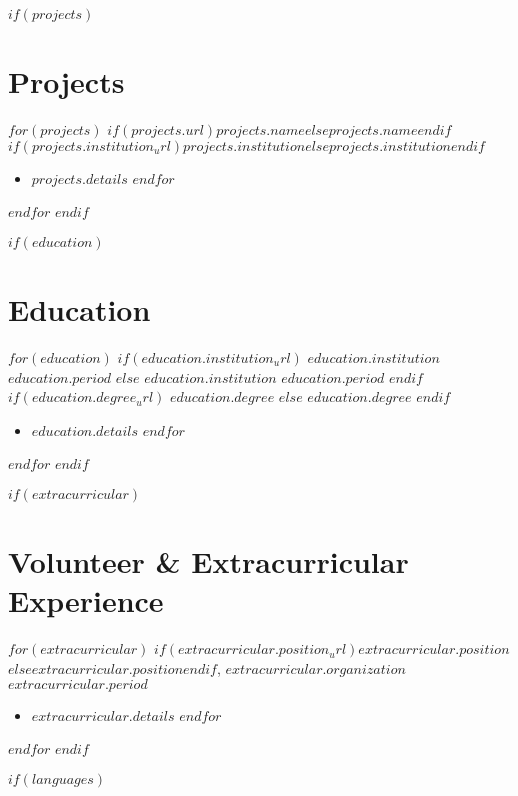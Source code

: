 \documentclass[10.5pt,a4paper]{article}
\newcommand{\daterange}[1]{\textbf{#1}}
\newcommand{\entryHeader}[2]{\noindent\textbf{#1} \hfill \daterange{#2}}
\newcommand{\entryHeaderLinked}[3]{\noindent\textbf{\href{#1}{#2}} \hfill \daterange{#3}}
\newcommand{\entrySubHeader}[1]{\textit{#1}}
\newcommand{\entrySubHeaderLinked}[2]{\textit{\href{#1}{#2}}}
\newenvironment{entryDetails}{%
  \begin{itemize}[leftmargin=*, itemsep=1pt, topsep=1pt, parsep=0pt]
}{%
  \end{itemize}
  \vspace{-0.1cm}
}
\begin{document}
$if(projects)$
\section*{Projects}
$for(projects)$
\noindent\textbf{$if(projects.url)$\href{$projects.url$}{$projects.name$}$else$$projects.name$$endif$} \hfill \textbf{$if(projects.institution_url)$\href{$projects.institution_url$}{$projects.institution$}$else$\textit{$projects.institution$}$endif$} %
\begin{entryDetails}
	$for(projects.details)$
	\item $projects.details$
	$endfor$
\end{entryDetails}
$endfor$
$endif$

$if(education)$
\section*{Education}
$for(education)$
$if(education.institution_url)$
\entryHeaderLinked{$education.institution_url$}{$education.institution$}{$education.period$}
$else$
\entryHeader{$education.institution$}{$education.period$}
$endif$
\\
$if(education.degree_url)$
\entrySubHeaderLinked{$education.degree_url$}{$education.degree$}
$else$
\entrySubHeader{$education.degree$}
$endif$
\begin{entryDetails}
	$for(education.details)$
	\item $education.details$
	$endfor$
\end{entryDetails}
$endfor$
$endif$

$if(extracurricular)$
\section*{Volunteer \& Extracurricular Experience}
$for(extracurricular)$
\noindent\textbf{$if(extracurricular.position_url)$\href{$extracurricular.position_url$}{$extracurricular.position$}$else$$extracurricular.position$$endif$}, $extracurricular.organization$ \hfill \daterange{$extracurricular.period$}
\begin{entryDetails}
	$for(extracurricular.details)$
	\item $extracurricular.details$
	$endfor$
\end{entryDetails}
$endfor$
$endif$

$if(languages)$
\end{document}
